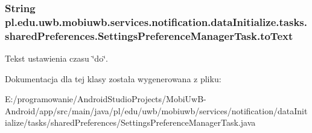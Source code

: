 \subsubsection[{to\+Text}]{\setlength{\rightskip}{0pt plus 5cm}String pl.\+edu.\+uwb.\+mobiuwb.\+services.\+notification.\+data\+Initialize.\+tasks.\+shared\+Preferences.\+Settings\+Preference\+Manager\+Task.\+to\+Text}\label{classpl_1_1edu_1_1uwb_1_1mobiuwb_1_1services_1_1notification_1_1data_initialize_1_1tasks_1_1sharfea0e1fb4d2269185de585e411b5e8b3_a3724e22d82556e8a58aeb6aa084729fa}
Tekst ustawienia czasu \char`\"{}do\char`\"{}. 

Dokumentacja dla tej klasy została wygenerowana z pliku\+:\begin{DoxyCompactItemize}
\item 
E\+:/programowanie/\+Android\+Studio\+Projects/\+Mobi\+Uw\+B-\/\+Android/app/src/main/java/pl/edu/uwb/mobiuwb/services/notification/data\+Initialize/tasks/shared\+Preferences/Settings\+Preference\+Manager\+Task.\+java\end{DoxyCompactItemize}
